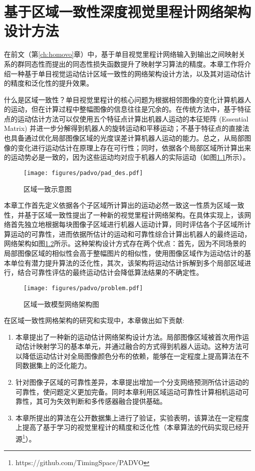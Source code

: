 \chapter{基于区域一致性深度视觉里程计网络架构设计方法}
\label{ch:padvo}
在前文（第\ref{ch:homovo}章）中，基于单目视觉里程计网络输入到输出之间映射关系的群同态性而提出的同态性损失函数提升了映射学习算法的精度。本章工作将介绍一种基于单目视觉运动估计区域一致性的网络架构设计方法，以及其对运动估计的精度和泛化性的提升效果。

什么是区域一致性？单目视觉里程计的核心问题为根据相邻图像的变化计算机器人的运动，但在计算过程中整幅图像的信息往往是冗余的。在传统方法中，基于特征点的运动估计方法可以仅使用五个特征点计算出机器人运动的本征矩阵 (Essential Matrix) 并进一步分解得到机器人的旋转运动和平移运动\cite{nister2004efficient}；不基于特征点的直接法也具备通过优化局部图像区域的光度误差计算机器人运动的能力\cite{engel2014lsd}。总之，从局部图像的变化进行运动估计在原理上存在可行性；同时，依据各个局部区域所计算出来的运动势必是一致的，因为这些运动均对应于机器人的实际运动（如图\ref{fig:pad_des}所示）。
\begin{figure}[h]
  \centering
  \texttt{[image: figures/padvo/pad\_des.pdf]}
  \caption{区域一致示意图}
  \label{fig:pad_des}
\end{figure}
本章工作首先定义依据各个子区域所计算出的运动必然一致这一性质为区域一致性，并基于区域一致性提出了一种新的视觉里程计网络架构。在具体实现上，该网络首先独立地根据每块图像子区域进行机器人运动计算，同时评估各个子区域所计算运动的可靠性，进而依据所估计的运动和可靠性综合计算出机器人的最终运动，网络架构如图\ref{fig:pad_problem}所示。这种架构设计方式存在两个优点：首先，因为不同场景的局部图像区域的相似性会高于整幅图片的相似性，使用图像区域作为运动估计的基本单位有潜力提升算法的泛化性，其次，该架构将运动估计拆解到多个局部区域进行，结合可靠性评估的最终运动估计会降低算法结果的不确定性。
\begin{figure}[h]
  \centering
  \texttt{[image: figures/padvo/problem.pdf]}
  \caption{区域一致模型网络架构图}
  \label{fig:pad_problem}
\end{figure}

在区域一致性网格架构的研究和实现中，本章做出如下贡献:
\begin{enumerate}
    \item 本章提出了一种新的运动估计网络架构设计方法。局部图像区域被首次用作运动估计映射学习的基本单元，并通过融合的方式得到机器人运动。这种方法可以降低运动估计对全局图像颜色分布的依赖，能够在一定程度上提高算法在不同数据集上的泛化能力。
    \item 针对图像子区域的可靠性差异，本章提出增加一个分支网络预测所估计运动的可靠性，使问题定义更加完备。同时本章利用区域运动可靠性计算相机运动可靠性，其可为失效判断和多传感器融合提供基础。
    \item 本章所提出的算法在公开数据集上进行了验证，实验表明，该算法在一定程度上提高了基于学习的视觉里程计的精度和泛化性（本章算法的代码实现已经开源\footnote{https://github.com/TimingSpace/PADVO}）。
\end{enumerate}


